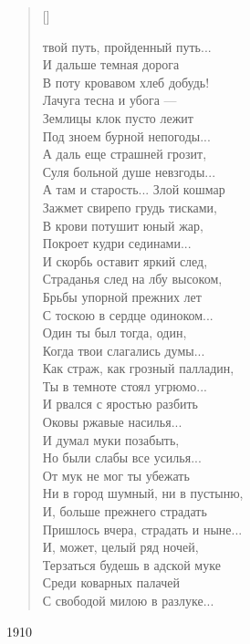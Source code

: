 \settowidth{\versewidth}{Тяжел твой путь, пройденный путь}
\begin{verse}[\versewidth]
\begin{patverse*}
 твой путь, пройденный путь...\\
И дальше темная дорога\\
В поту кровавом хлеб добудь!\\
Лачуга тесна и убога ---\\
Землицы клок пусто лежит\\
Под зноем бурной непогоды...\\
А даль еще страшней грозит,\\
Суля больной душе невзгоды...\\
А там и старость... Злой кошмар\\
Зажмет свирепо грудь тисками,\\
В крови потушит юный жар,\\
Покроет кудри сединами...\\
И скорбь оставит яркий след,\\
Страданья след на лбу высоком,\\
Брьбы упорной прежних лет\\
С тоскою в сердце одиноком...\\
Один ты был тогда, один,\\
Когда твои слагались думы...\\
Как страж, как грозный палладин,\\
Ты в темноте стоял угрюмо...\\
И рвался с яростью разбить\\
Оковы ржавые насилья...\\
И думал муки позабыть,\\
Но были слабы все усилья...\\
От мук не мог ты убежать\\
Ни в город шумный, ни в пустыню,\\
И, больше прежнего страдать\\
Пришлось вчера, страдать и ныне...\\
И, может, целый ряд ночей,\\
Терзаться будешь в адской муке\\
Среди коварных палачей\\
С свободой милою в разлуке...
\end{patverse*}
\end{verse}
1910

